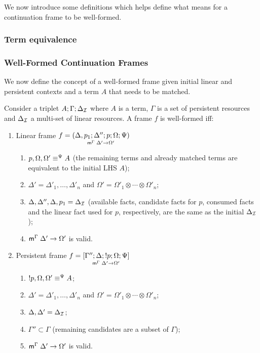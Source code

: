 We now introduce some definitions which helps define what means for a
continuation frame to be well-formed.

\subsubsection{Term equivalence}



\subsubsection{Well-Formed Continuation Frames}

We now define the concept of a well-formed frame given initial linear and
persistent contexts and a term $A$ that needs to be matched.

\begin{definition}

Consider a triplet $A; \Gamma; \deltan$ where $A$ is a term, $\Gamma$ is a set
of persistent resources and $\deltan$ a multi-set of linear resources. A frame
$f$ is well-formed iff:

\begin{enumerate}[leftmargin=*]
   \item Linear frame $f = \lframe{\Delta,
      p_1}{\Delta''}{p}{\Omega; \Psi}{\Delta'}{\Omega'}$

   \begin{enumerate}
      \item $\feqa{p, \Omega, \Omega'}{A}{\Psi}{\Psi}$ (the remaining terms and already
               matched terms are equivalent to the initial LHS $A$);
      \item $\Delta' = \Delta'_1, \dotsc, \Delta'_n$ and $\Omega' = \Omega'_1 \otimes \dotsb \otimes \Omega'_n$;
      \item $\Delta, \Delta'', \Delta, p_1 = \deltan$ (available facts, candidate
            facts for $p$, consumed facts and the linear fact used for $p$,
            respectively, are the same as the initial $\deltan$);
      \item $\mz{\Gamma}{\Delta'}{\Omega'}$ is valid.

   \end{enumerate}
   \item Persistent frame $f = \pframe{\Gamma''}{\Delta}{\bang p}{\Omega; \Psi}{\Delta'}{\Omega'}$

   \begin{enumerate}
      \item $\feqa{\bang p, \Omega, \Omega'}{A}{\Psi}{\Psi}$;
      \item $\Delta' = \Delta'_1, \dotsc, \Delta'_n$ and $\Omega' =
      \Omega'_1 \otimes \dotsb \otimes \Omega'_n$;
      \item $\Delta, \Delta' = \deltan$;
      \item $\Gamma'' \subset \Gamma$ (remaining candidates are a subset of
                  $\Gamma$);
      \item $\mz{\Gamma}{\Delta'}{\Omega'}$ is valid.
   \end{enumerate}
\end{enumerate}
\end{definition}

